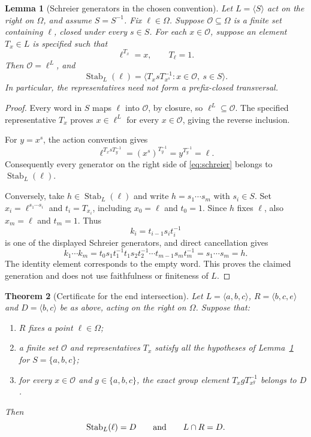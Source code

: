 \documentclass[11pt]{article}
\newtheorem{theorem}{Theorem}
\newtheorem{lemma}[theorem]{Lemma}
\theoremstyle{remark}
\newcommand{\gen}[1]{\langle #1\rangle}
\newcommand{\Stab}{\operatorname{Stab}}
\begin{document}
\begin{lemma}[Schreier generators in the chosen convention]\label{lem:schreier}
Let $L=\gen{S}$ act on the right on $\Omega$, and assume $S=S^{-1}$.
Fix $\ell\in\Omega$. Suppose $\mathcal O\subseteq\Omega$ is a finite set
containing $\ell$, closed under every $s\in S$. For each $x\in\mathcal O$,
suppose an element $T_x\in L$ is specified such that
\[
 \ell^{T_x}=x,\qquad T_\ell=1.
\]
Then $\mathcal O=\ell^L$, and
\begin{equation}\label{eq:schreier}
 \Stab_L(\ell)=
 \gen{T_x s T_{x^s}^{-1}:x\in\mathcal O,\ s\in S}.
\end{equation}
In particular, the representatives need not form a prefix-closed transversal.
\end{lemma}

\begin{proof}
Every word in $S$ maps $\ell$ into $\mathcal O$, by closure, so
$\ell^L\subseteq\mathcal O$. The specified representative $T_x$ proves
$x\in\ell^L$ for every $x\in\mathcal O$, giving the reverse inclusion.

For $y=x^s$, the action convention gives
\[
 \ell^{T_xsT_y^{-1}}=(x^s)^{T_y^{-1}}
 =y^{T_y^{-1}}=\ell.
\]
Consequently every generator on the right side of \eqref{eq:schreier}
belongs to $\Stab_L(\ell)$.

Conversely, take $h\in\Stab_L(\ell)$ and write
$h=s_1\cdots s_m$ with $s_i\in S$.
Set $x_i=\ell^{s_1\cdots s_i}$ and $t_i=T_{x_i}$, including
$x_0=\ell$ and $t_0=1$. Since $h$ fixes $\ell$, also $x_m=\ell$ and
$t_m=1$. Thus
\[
 k_i=t_{i-1}s_i t_i^{-1}
\]
is one of the displayed Schreier generators, and direct cancellation gives
\[
 k_1\cdots k_m
 =t_0s_1t_1^{-1}t_1s_2t_2^{-1}\cdots t_{m-1}s_mt_m^{-1}
 =s_1\cdots s_m=h.
\]
The identity element corresponds to the empty word. This proves the claimed
generation and does not use faithfulness or finiteness of $L$.
\end{proof}

\begin{theorem}[Certificate for the end intersection]\label{thm:ends}
Let $L=\gen{a,b,c}$, $R=\gen{b,c,e}$ and $D=\gen{b,c}$ be as above,
acting on the right on $\Omega$. Suppose that:
\begin{enumerate}
\item $R$ fixes a point $\ell\in\Omega$;
\item a finite set $\mathcal O$ and representatives $T_x$ satisfy all the
      hypotheses of Lemma~\ref{lem:schreier} for $S=\{a,b,c\}$;
\item for every $x\in\mathcal O$ and $g\in\{a,b,c\}$, the exact group
      element $T_xgT_{x^g}^{-1}$ belongs to $D$.
\end{enumerate}
Then
\[
 \Stab_L(\ell)=D\qquad\hbox{and}\qquad L\cap R=D.
\]
\end{theorem}
\end{document}
